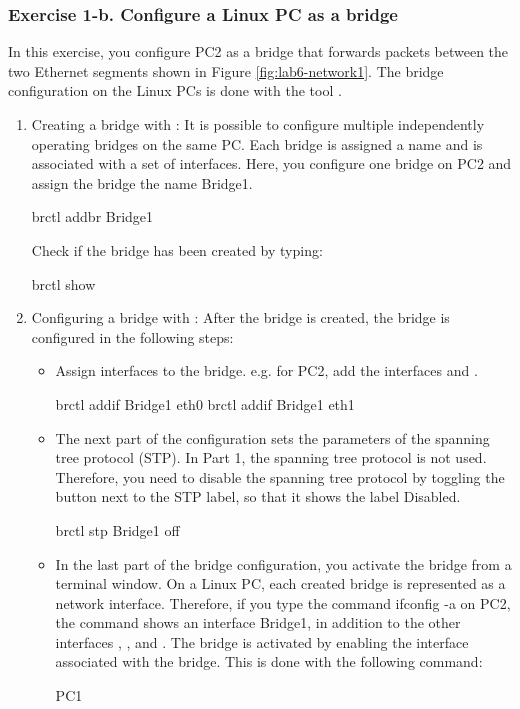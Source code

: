 \subsubsection{Exercise 1-b. Configure a Linux PC as a bridge}
In this exercise, you configure PC2 as a bridge that forwards packets between the two Ethernet segments shown in Figure \ref{fig:lab6-network1}. The bridge configuration on the Linux PCs is done with the tool .
\begin{enumerate}
	\item Creating a bridge with : It is possible to configure multiple independently operating bridges on the same PC. Each bridge is assigned a name and is associated with a set of interfaces. Here, you configure one bridge on PC2 and assign the bridge the name Bridge1.
		\begin{cmdblock}
	brctl addbr Bridge1
		\end{cmdblock}
		Check if the bridge has been created by typing:
		\begin{cmdblock}
	brctl show
		\end{cmdblock}
	\item Configuring a bridge with : After the bridge is created, the bridge is configured in the following steps:
		\begin{itemize}
			\item Assign interfaces to the bridge. e.g. for PC2, add the interfaces  and .
				\begin{cmdblock}
	brctl addif Bridge1 eth0
	brctl addif Bridge1 eth1
				\end{cmdblock}
			\item The next part of the configuration sets the parameters of the spanning tree protocol (STP). In Part 1, the spanning tree protocol is not used. Therefore, you need to disable the spanning tree protocol by toggling the button next to the STP label, so that it shows the label Disabled.
				\begin{cmdblock}
	brctl stp Bridge1 off
				\end{cmdblock}
			\item In the last part of the bridge configuration, you activate the bridge  from a terminal window. On a Linux PC, each created bridge is represented as a network interface. Therefore, if you type the command ifconfig -a on PC2, the command shows an interface Bridge1, in addition to the other interfaces , , and . The bridge is activated by enabling the interface associated with the bridge. This is done with the following command:
				\begin{cmdblock}
	PC1%
			\end{cmdblock}
		\end{itemize}
\end{enumerate}

